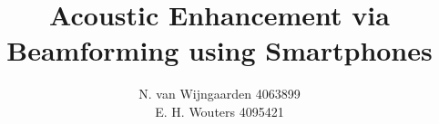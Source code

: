 \documentclass[print]{tudelft-report}
\begin{document}
\frontmatter

\title[\today]{Acoustic Enhancement via Beamforming using Smartphones}

\author{N. van Wijngaarden 4063899\\E. H. Wouters 4095421}


\makecover

%



\tableofcontents

\printnomenclature[3cm]

\listoffigures	%
\listoftables	%

\mainmatter














\appendix

%




\end{document}

